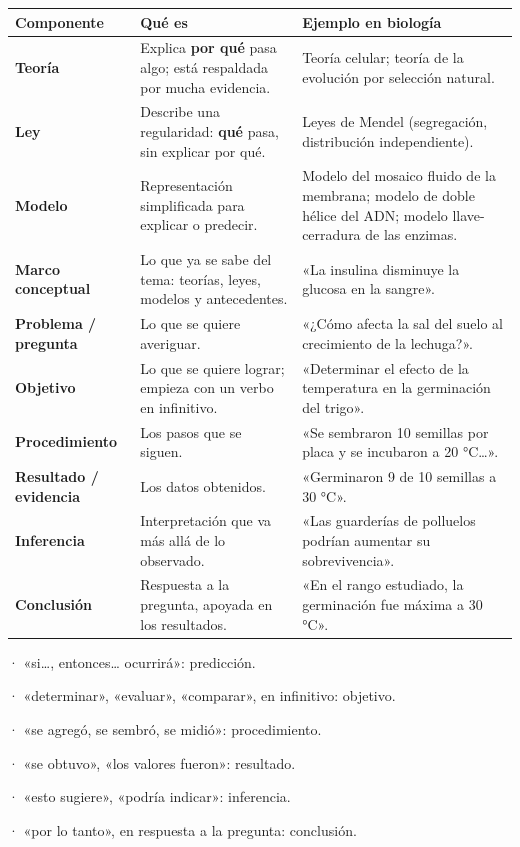  
\begin{center}\small
\begin{tabularx}{\linewidth}{@{}>{\raggedright\arraybackslash\hsize=0.62\hsize}X>{\raggedright\arraybackslash\hsize=1.19\hsize}X>{\raggedright\arraybackslash\hsize=1.19\hsize}X@{}}
\toprule
\textbf{Componente} & \textbf{Qué es} & \textbf{Ejemplo en biología} \\
\midrule
\textbf{Teoría} & Explica \textbf{por qué} pasa algo; está respaldada por mucha evidencia. & Teoría celular; teoría de la evolución por selección natural. \\
\textbf{Ley} & Describe una regularidad: \textbf{qué} pasa, sin explicar por qué. & Leyes de Mendel (segregación, distribución independiente). \\
\textbf{Modelo} & Representación simplificada para explicar o predecir. & Modelo del mosaico fluido de la membrana; modelo de doble hélice del ADN; modelo llave-cerradura de las enzimas. \\
\textbf{Marco conceptual} & Lo que ya se sabe del tema: teorías, leyes, modelos y antecedentes. & «La insulina disminuye la glucosa en la sangre». \\
\textbf{Problema / pregunta} & Lo que se quiere averiguar. & «¿Cómo afecta la sal del suelo al crecimiento de la lechuga?». \\
\textbf{Objetivo} & Lo que se quiere lograr; empieza con un verbo en infinitivo. & «Determinar el efecto de la temperatura en la germinación del trigo». \\
\textbf{Procedimiento} & Los pasos que se siguen. & «Se sembraron 10 semillas por placa y se incubaron a 20 °C\dots{}». \\
\textbf{Resultado / evidencia} & Los datos obtenidos. & «Germinaron 9 de 10 semillas a 30 °C». \\
\textbf{Inferencia} & Interpretación que va más allá de lo observado. & «Las guarderías de polluelos podrían aumentar su sobrevivencia». \\
\textbf{Conclusión} & Respuesta a la pregunta, apoyada en los resultados. & «En el rango estudiado, la germinación fue máxima a 30 °C». \\
\bottomrule
\end{tabularx}
\end{center}
  
\begin{clave} · «si\dots{}, entonces\dots{} ocurrirá»: predicción.\par · «determinar», «evaluar», «comparar», en infinitivo: objetivo.\par · «se agregó, se sembró, se midió»: procedimiento.\par · «se obtuvo», «los valores fueron»: resultado.\par · «esto sugiere», «podría indicar»: inferencia.\par · «por lo tanto», en respuesta a la pregunta: conclusión.\end{clave}
  
